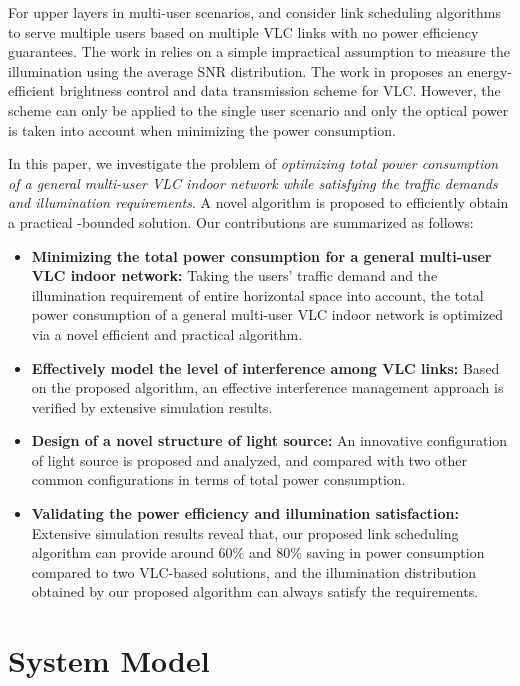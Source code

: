 \documentclass[10pt,journal]{IEEEtran}
\begin{document}
For upper layers in multi-user scenarios, \cite{li2012vico} and \cite{tao2015scheduling} consider link scheduling algorithms to serve multiple users based on multiple VLC links with no power efficiency guarantees. The work in \cite{li2012vico} relies on a simple impractical assumption to measure the illumination using the average SNR distribution. The work in \cite{din2014energy} proposes an energy-efficient brightness control and data transmission scheme for VLC. However, the scheme can only be applied to the single user scenario and only the optical power is taken into account when minimizing the power consumption.

In this paper, we investigate the problem of {\it optimizing total power consumption of a general multi-user VLC indoor network while satisfying the traffic demands and illumination requirements}. A novel algorithm is proposed to efficiently obtain a practical -bounded solution. Our contributions are summarized as follows:



\begin{itemize}
\item {\bf Minimizing the total power consumption for a general multi-user VLC indoor network:} Taking the users' traffic demand and the illumination requirement of entire horizontal space into account, the total power consumption of a general multi-user VLC indoor network is optimized via a novel efficient and practical algorithm.
\item {\bf Effectively model the level of interference among VLC links:} Based on the proposed algorithm, an effective interference management approach is verified by extensive simulation results.
\item {\bf Design of a novel structure of light source:} An innovative configuration of light source is proposed and analyzed, and compared with two other common configurations in terms of total power consumption.
\item {\bf Validating the power efficiency and illumination satisfaction:} Extensive simulation results reveal that, our proposed link scheduling algorithm can provide around 60\% and 80\% saving in power consumption compared to two VLC-based solutions, and the illumination distribution obtained by our proposed algorithm can always satisfy the requirements.
\end{itemize}


\section{System Model}\label{system_model}
\end{document}
